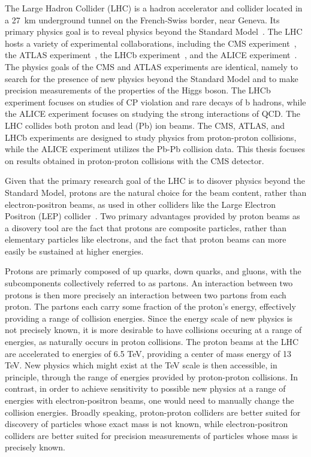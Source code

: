 The Large Hadron Collider (LHC) is a hadron accelerator and collider located in a 27~km underground tunnel on the French-Swiss border, near Geneva.
Its primary physics goal is to reveal physics beyond the Standard Model~\cite{Evans_2008}.
The LHC hosts a variety of experimental collaborations, including the CMS experiment~\cite{Chatrchyan:2008aa}, the ATLAS experiment~\cite{Aad:2008zzm}, the LHCb experiment~\cite{Alves:2008zz}, and the ALICE experiment~\cite{Aamodt:2008zz}.
The physics goals of the CMS and ATLAS experiments are identical, namely to search for the presence of new physics beyond the Standard Model and to make precision measurements of the properties of the Higgs boson.
The LHCb experiment focuses on studies of CP violation and rare decays of b hadrons, while the ALICE experiment focuses on studying the strong interactions of QCD.
The LHC collides both proton and lead (Pb) ion beams.
The CMS, ATLAS, and LHCb experiments are designed to study physics from proton-proton collisions, while the ALICE experiment utilizes the Pb-Pb collision data.
This thesis focuses on results obtained in proton-proton collisions with the CMS detector.

Given that the primary research goal of the LHC is to disover physics beyond the Standard Model, protons are the natural choice for the beam content, rather than electron-positron beams, as used in other colliders like the Large Electron Positron (LEP) collider~\cite{Taylor:2017edx}.
Two primary advantages provided by proton beams as a disovery tool are the fact that protons are composite particles, rather than elementary particles like electrons, and the fact that proton beams can more easily be sustained at higher energies.

Protons are primarly composed of up quarks, down quarks, and gluons, with the subcomponents collectively referred to as partons.
An interaction between two protons is then more precisely an interaction between two partons from each proton.
The partons each carry some fraction of the proton's energy, effectively providing a range of collision energies.
Since the energy scale of new physics is not precisely known, it is more desirable to have collisions occuring at a range of energies, as naturally occurs in proton collisions.
The proton beams at the LHC are accelerated to energies of 6.5 TeV, providing a center of mass energy of 13 TeV.
New physics which might exist at the TeV scale is then accessible, in principle, through the range of energies provided by proton-proton collisions.
In contrast, in order to achieve sensitivity to possible new physics at a range of energies with electron-positron beams, one would need to manually change the collision energies.
Broadly speaking, proton-proton colliders are better suited for discovery of particles whose exact mass is not known, while electron-positron colliders are better suited for precision measurements of particles whose mass is precisely known.

